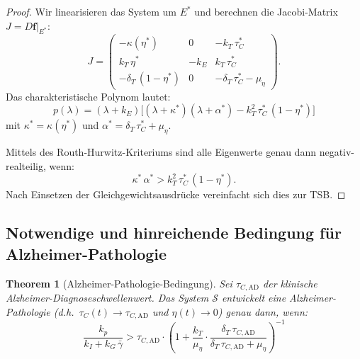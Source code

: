 ﻿\documentclass[12pt,a4paper]{article}
\newtheorem{theorem}{Theorem}[section]
\theoremstyle{definition}
\begin{document}
	\begin{proof}
		Wir linearisieren das System um $E^*$ und berechnen die Jacobi-Matrix $J = D\mathbf{f}|_{E^*}$:
		\[
		J = \begin{pmatrix}
			-\kappa(\eta^*) & 0 & -k_T\,\tau_C^* \\
			k_T\,\eta^* & -k_E & k_T\,\tau_C^* \\
			-\delta_T\,(1-\eta^*) & 0 & -\delta_T\,\tau_C^* - \mu_\eta
		\end{pmatrix}.
		\]
		Das charakteristische Polynom lautet:
		\[
		p(\lambda) = (\lambda + k_E)\bigl[(\lambda + \kappa^*)(\lambda + \alpha^*) - k_T^2\,\tau_C^*\,(1-\eta^*)\bigr]
		\]
		mit $\kappa^* = \kappa(\eta^*)$ und $\alpha^* = \delta_T\,\tau_C^* + \mu_\eta$.
		
		Mittels des Routh-Hurwitz-Kriteriums sind alle Eigenwerte genau dann negativ-realteilig, wenn:
		\[
		\kappa^*\,\alpha^* > k_T^2\,\tau_C^*\,(1-\eta^*).
		\]
		Nach Einsetzen der Gleichgewichtsausdrücke vereinfacht sich dies zur TSB.
	\end{proof}
	
	\subsection{Notwendige und hinreichende Bedingung für Alzheimer-Pathologie}
	
	\begin{theorem}[Alzheimer-Pathologie-Bedingung]
		\label{thm:alzheimer_condition}
		Sei $\tau_{C,\text{AD}}$ der klinische Alzheimer-Diagnoseschwellenwert. Das System $\mathcal{S}$ entwickelt eine Alzheimer-Pathologie (d.h.\ $\tau_C(t) \to \tau_{C,\text{AD}}$ und $\eta(t) \to 0$) genau dann, wenn:
		\begin{equation}
			\boxed{\frac{k_p}{k_I + k_G\,\bar{\gamma}} > \tau_{C,\text{AD}} \cdot \left(1 + \frac{k_T}{\mu_\eta}\cdot\frac{\delta_T\,\tau_{C,\text{AD}}}{\delta_T\,\tau_{C,\text{AD}} + \mu_\eta}\right)^{-1}}
			\label{eq:alzheimer_bedingung}
		\end{equation}
	\end{theorem}
	
\end{document}
